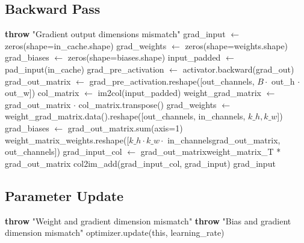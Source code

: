 \documentclass{article}
\begin{document}
\subsection{Backward Pass}
\begin{algorithm}
\caption{Backward Pass}
\begin{algorithmic}[1]
        \State \textbf{throw} "Gradient output dimensions mismatch"
    \EndIf
    \State grad\_input $\gets$ zeros(shape=in\_cache.shape)
        \State grad\_weights $\gets$ zeros(shape=weights.shape)
            \State grad\_biases $\gets$ zeros(shape=biases.shape)
        \EndIf
    \EndIf
    \State input\_padded $\gets$ pad\_input(in\_cache)
    \State grad\_pre\_activation $\gets$ activator.backward(grad\_out)
    \State grad\_out\_matrix $\gets$ grad\_pre\_activation.reshape([out\_channels, $B \cdot$ out\_h $\cdot$ out\_w])
        \State col\_matrix $\gets$ im2col(input\_padded)
        \State weight\_grad\_matrix $\gets$ grad\_out\_matrix $\cdot$ col\_matrix.transpose()
        \State grad\_weights $\gets$ weight\_grad\_matrix.data().reshape([out\_channels, in\_channels, $k\_h, k\_w$])
            \State grad\_biases $\gets$ grad\_out\_matrix.sum(axis=1)
        \EndIf
    \EndIf
    \State weight\_matrix\_weights.reshape([$k\_h \cdot k\_w \cdot$ in\_channelsgrad\_out\_matrix, out\_channels])
    \State grad\_input\_col $\gets$ grad\_out\_matrixweight\_matrix\_T * grad\_out\_matrix
    \State col2im\_add(grad\_input\_col, grad\_input)
    \State \Return grad\_input
\EndFunction
\end{algorithmic}
\end{algorithm}

\subsection{Parameter Update}
\begin{algorithm}
\caption{Update Parameters}
\begin{algorithmic}[1]
        \State \Return
    \EndIf
        \State \textbf{throw} "Weight and gradient dimension mismatch"
    \EndIf
        \State \textbf{throw} "Bias and gradient dimension mismatch"
    \EndIf
    \State optimizer.update(this, learning\_rate)
\EndFunction
\end{algorithmic}
\end{algorithm}
\end{document}
